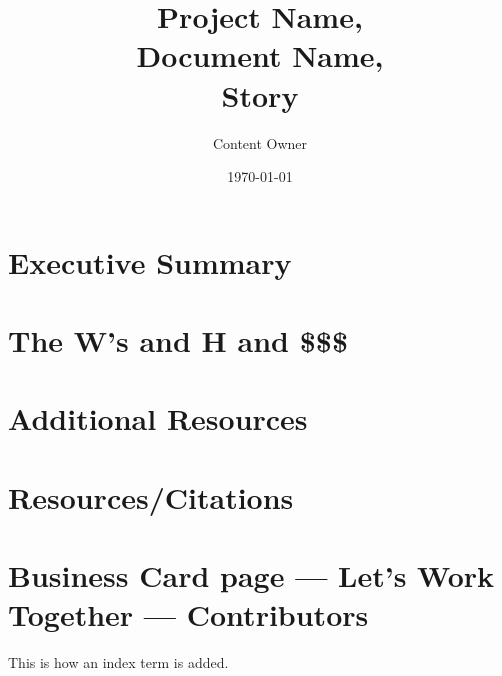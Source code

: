 \documentclass[x11names]{report}
\author{Content Owner}
\title{Project Name,\\ Document Name,\\ Story}
\date{\today}
\begin{document}
\maketitle
\thispagestyle{companypagestyle}


\section{Executive Summary}
\lipsum[1-3]
\section{The W's and H and \$\$\$}
\lipsum[1-3]
\section{Additional Resources}
\lipsum[1-3]
\section{Resources/Citations}
\lipsum[3-9]

\section{Business Card page --- Let's Work Together --- Contributors}

\lipsum[1-2]
This is how an index term is added. 
\nocite{*}



\printindex
\end{document}
